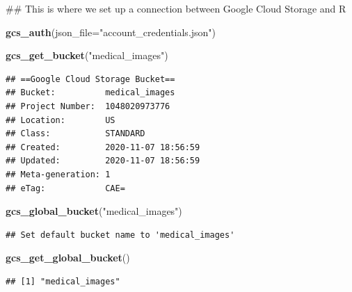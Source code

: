 \documentclass[12pt]{article}
\newenvironment{Shaded}{\begin{snugshade}}{\end{snugshade}}
\newcommand{\DataTypeTok}[1]{\textcolor[rgb]{0.13,0.29,0.53}{#1}}
\newcommand{\DecValTok}[1]{\textcolor[rgb]{0.00,0.00,0.81}{#1}}
\newcommand{\KeywordTok}[1]{\textcolor[rgb]{0.13,0.29,0.53}{\textbf{#1}}}
\newcommand{\NormalTok}[1]{#1}
\newcommand{\OperatorTok}[1]{\textcolor[rgb]{0.81,0.36,0.00}{\textbf{#1}}}
\newcommand{\OtherTok}[1]{\textcolor[rgb]{0.56,0.35,0.01}{#1}}
\newcommand{\StringTok}[1]{\textcolor[rgb]{0.31,0.60,0.02}{#1}}
\begin{document}
\#\# This is where we set up a connection between Google Cloud Storage
and R

\begin{Shaded}
\begin{Highlighting}[]
\KeywordTok{gcs_auth}\NormalTok{(}\DataTypeTok{json_file=}\StringTok{"account_credentials.json"}\NormalTok{)}

\KeywordTok{gcs_get_bucket}\NormalTok{(}\StringTok{"medical_images"}\NormalTok{)   }
\end{Highlighting}
\end{Shaded}

\begin{verbatim}
## ==Google Cloud Storage Bucket==
## Bucket:          medical_images 
## Project Number:  1048020973776 
## Location:        US 
## Class:           STANDARD 
## Created:         2020-11-07 18:56:59 
## Updated:         2020-11-07 18:56:59 
## Meta-generation: 1 
## eTag:            CAE=
\end{verbatim}

\begin{Shaded}
\begin{Highlighting}[]
\KeywordTok{gcs_global_bucket}\NormalTok{(}\StringTok{"medical_images"}\NormalTok{)}
\end{Highlighting}
\end{Shaded}

\begin{verbatim}
## Set default bucket name to 'medical_images'
\end{verbatim}

\begin{Shaded}
\begin{Highlighting}[]
\KeywordTok{gcs_get_global_bucket}\NormalTok{()}
\end{Highlighting}
\end{Shaded}

\begin{verbatim}
## [1] "medical_images"
\end{verbatim}

\begin{Shaded}
\end{Shaded}
\end{document}
